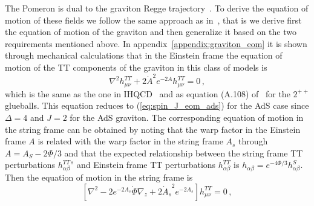 \documentclass[a4paper,12pt]{article}
\begin{document}
The Pomeron is dual to the graviton Regge trajectory~\cite{brower_pomeron_2007}. To derive the equation of motion of these fields we follow the same approach as in~\cite{Ballon-Bayona:2015wra, ballon_bayona_unity_2017}, that is we derive first the equation of motion of the graviton and then generalize it based on the two requirements mentioned above. In appendix~\ref{appendix:graviton_eom} it is shown through mechanical calculations that in the Einstein frame the equation of motion of the TT components of the graviton in this class of models is
\begin{equation}
\nabla^2 h^{TT}_{\mu \nu} + 2 {\dot{A}}^2 e^{-2A} h^{TT}_{\mu \nu} = 0 \, ,
\label{eq:graviton_eom}
\end{equation}
which is the same as the one in IHQCD~\cite{Ballon-Bayona:2015wra, ballon_bayona_unity_2017} and as equation (A.108) of~\cite{Arean:2013tja} for the $2^{++}$ glueballs. This equation reduces to (\ref{eq:spin_J_eom_ads}) for the AdS case since $\Delta = 4$ and $J  = 2$ for the AdS graviton. The corresponding equation of motion in the string frame can be obtained by noting that the warp factor in the Einstein frame $A$ is related with the warp factor in the string frame $A_s$ through $A = A_S - 2 \Phi / 3$ and that the expected relationship between the string frame TT perturbations $h^{TT \, s}_{\alpha \beta}$ and Einstein frame TT perturbations $h^{TT}_{\alpha \beta}$ is $h_{\alpha \beta} = e^{- 4 \Phi / 3} h^S_{\alpha \beta}$. Then the equation of motion in the string frame is
\begin{equation}
\left[\nabla^2 - 2 e^{-2 A_s} \dot{\Phi} \nabla_z + 2 {\dot{A}_s}^2 e^{-2A_s} \right] h^{TT}_{\mu \nu} = 0 \, ,
\label{eq:graviton_eom_string_frame}
\end{equation}
\end{document}
